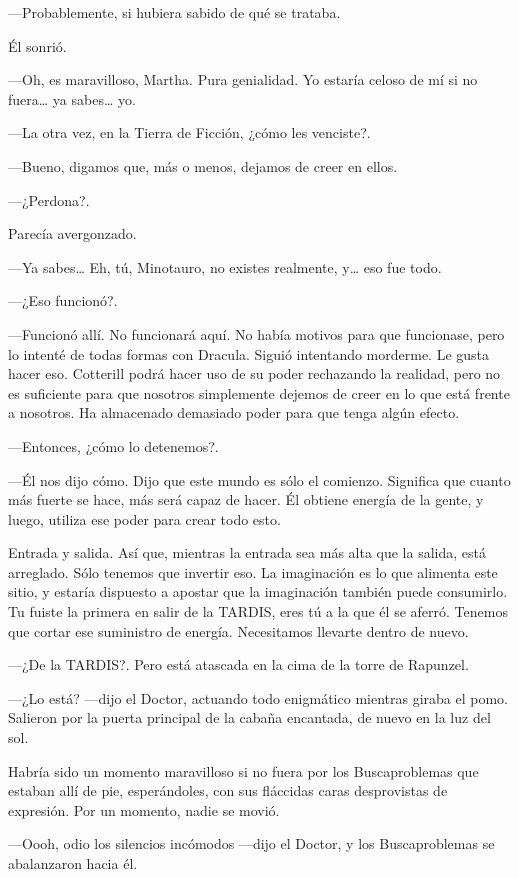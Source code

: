 ---Probablemente, si hubiera sabido de qué se trataba.

Él sonrió.

---Oh, es maravilloso, Martha. Pura genialidad. Yo estaría celoso de mí si no fuera\ldots{} ya sabes\ldots{} yo.

---La otra vez, en la Tierra de Ficción, ¿cómo les venciste?.

---Bueno, digamos que, más o menos, dejamos de creer en ellos.

---¿Perdona?.

Parecía avergonzado.

---Ya sabes\ldots{} Eh, tú, Minotauro, no existes realmente, y\ldots{} eso fue todo.

---¿Eso funcionó?.

---Funcionó allí. No funcionará aquí. No había motivos para que funcionase, pero lo intenté de todas formas con Dracula. Siguió intentando morderme. Le gusta hacer eso. Cotterill podrá hacer uso de su poder rechazando la realidad, pero no es suficiente para que nosotros simplemente dejemos de creer en lo que está frente a nosotros. Ha almacenado demasiado poder para que tenga algún efecto.

---Entonces, ¿cómo lo detenemos?.

---Él nos dijo cómo. Dijo que este mundo es sólo el comienzo. Significa que cuanto más fuerte se hace, más será capaz de hacer. Él obtiene energía de la gente, y luego, utiliza ese poder para crear todo esto.

Entrada y salida. Así que, mientras la entrada sea más alta que la salida, está arreglado. Sólo tenemos que invertir eso. La imaginación es lo que alimenta este sitio, y estaría dispuesto a apostar que la imaginación también puede consumirlo. Tu fuiste la primera en salir de la TARDIS, eres tú a la que él se aferró. Tenemos que cortar ese suministro de energía. Necesitamos llevarte dentro de nuevo.

---¿De la TARDIS?. Pero está atascada en la cima de la torre de Rapunzel.

---¿Lo está? ---dijo el Doctor, actuando todo enigmático mientras giraba el pomo. Salieron por la puerta principal de la cabaña encantada, de nuevo en la luz del sol.

Habría sido un momento maravilloso si no fuera por los Buscaproblemas que estaban allí de pie, esperándoles, con sus fláccidas caras desprovistas de expresión. Por un momento, nadie se movió.

---Oooh, odio los silencios incómodos ---dijo el Doctor, y los Buscaproblemas se abalanzaron hacia él.

